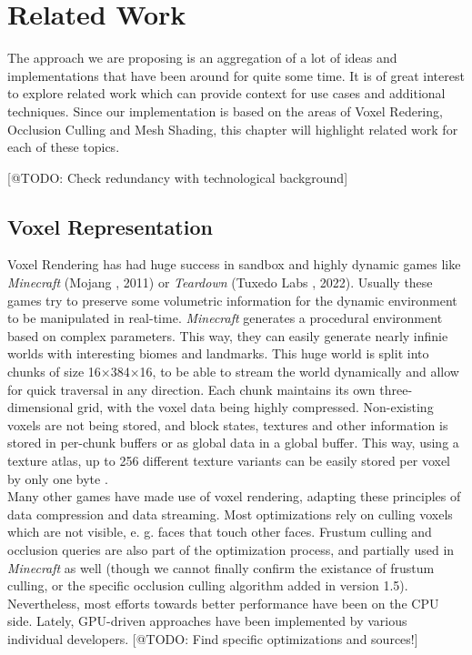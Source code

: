 \chapter{Related Work} \label{cpt-related-work}

The approach we are proposing is an aggregation of a lot of ideas and implementations that have been 
around for quite some time. It is of great interest to explore related work which can provide 
context for use cases and additional techniques. Since our implementation is based on the areas 
of Voxel Redering, Occlusion Culling and Mesh Shading, this chapter will highlight related work 
for each of these topics. 


[@TODO: Check redundancy with technological background]

\section{Voxel Representation}

Voxel Rendering has had huge success in sandbox and highly dynamic games like \emph{Minecraft} (Mojang 
\cite{Mojang2024}, 2011) or \emph{Teardown} (Tuxedo Labs \cite{TuxedoLabs2022}, 2022). Usually these games try 
to preserve some volumetric information for the dynamic environment to be manipulated in real-time. \emph{Minecraft} 
generates a procedural environment based on complex parameters. This way, they can easily generate nearly infinie 
worlds with interesting biomes and landmarks. This huge world is split into chunks of size 16×384×16, to be able to 
stream the world dynamically and allow for quick traversal in any direction. Each chunk maintains its own 
three-dimensional grid, with the voxel data being highly compressed. Non-existing voxels are not being stored, and 
block states, textures and other information is stored in per-chunk buffers or as global data in a global buffer. 
This way, using a texture atlas, up to 256 different texture variants can be easily stored per voxel by only one byte 
\cite{Bergensten2012, MinecraftFandom2021}. \\

\noindent
Many other games have made use of voxel rendering, adapting these principles of data compression and data streaming. 
Most optimizations rely on culling voxels which are not visible, e. g. faces that touch other faces.
Frustum culling and occlusion queries are also part of the optimization process, and partially used in \emph{Minecraft} 
as well (though we cannot finally confirm the existance of frustum culling, or the specific occlusion culling 
algorithm added in version 1.5). Nevertheless, most efforts towards better performance have been on the \ac{CPU} side.
Lately, \ac{GPU}-driven approaches have been implemented by various individual developers. [@TODO: Find specific 
optimizations and sources!]  \\


